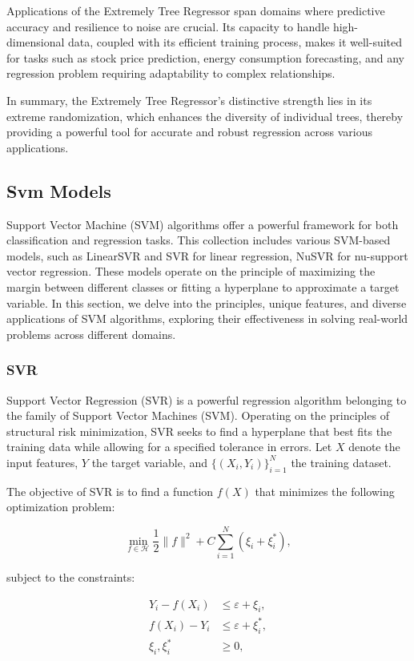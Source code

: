 \documentclass[twocolumn]{article}
\begin{document}
Applications of the Extremely Tree Regressor span domains where predictive accuracy and resilience to noise are crucial. Its capacity to handle high-dimensional data, coupled with its efficient training process, makes it well-suited for tasks such as stock price prediction, energy consumption forecasting, and any regression problem requiring adaptability to complex relationships.

In summary, the Extremely Tree Regressor's distinctive strength lies in its extreme randomization, which enhances the diversity of individual trees, thereby providing a powerful tool for accurate and robust regression across various applications.

	\subsection{Svm Models}
Support Vector Machine (SVM) algorithms offer a powerful framework for both classification and regression tasks. This collection includes various SVM-based models, such as LinearSVR and SVR for linear regression, NuSVR for nu-support vector regression. These models operate on the principle of maximizing the margin between different classes or fitting a hyperplane to approximate a target variable. In this section, we delve into the principles, unique features, and diverse applications of SVM algorithms, exploring their effectiveness in solving real-world problems across different domains.
		\subsubsection{SVR}
Support Vector Regression (SVR) is a powerful regression algorithm belonging to the family of Support Vector Machines (SVM). Operating on the principles of structural risk minimization, SVR seeks to find a hyperplane that best fits the training data while allowing for a specified tolerance in errors. Let \(X\) denote the input features, \(Y\) the target variable, and \(\{(X_i, Y_i)\}_{i=1}^{N}\) the training dataset.

The objective of SVR is to find a function \(f(X)\) that minimizes the following optimization problem:

\[ \min_{f \in \mathcal{H}} \frac{1}{2} \|f\|^2 + C \sum_{i=1}^{N} \left(\xi_i + \xi_i^*\right), \]

subject to the constraints:

\[
\begin{aligned}
Y_i - f(X_i) &\leq \varepsilon + \xi_i, \\
f(X_i) - Y_i &\leq \varepsilon + \xi_i^*, \\
\xi_i, \xi_i^* &\geq 0,
\end{aligned}
\]
\end{document}
